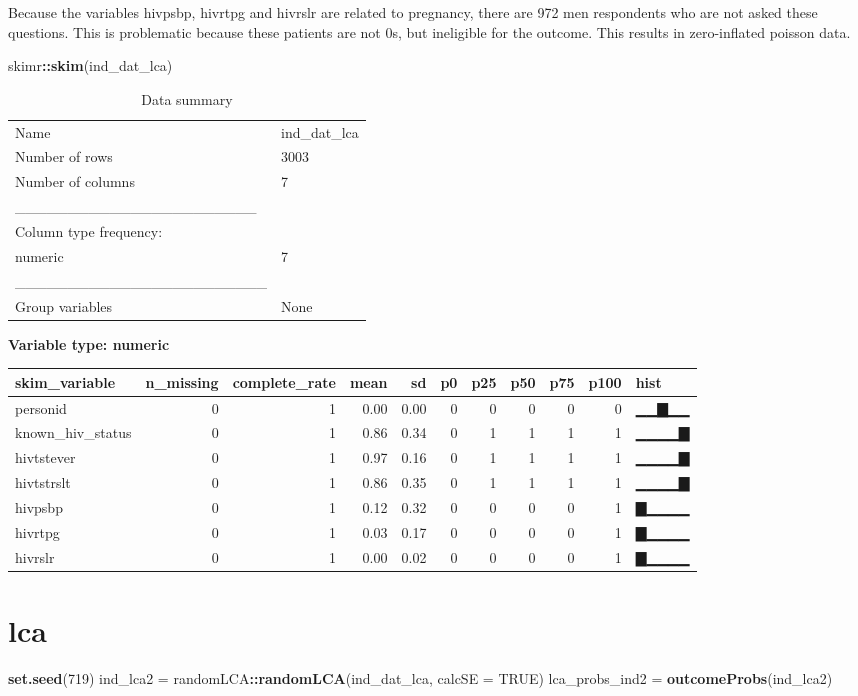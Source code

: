 \documentclass[
]{article}
\newenvironment{Shaded}{\begin{snugshade}}{\end{snugshade}}
\newcommand{\DataTypeTok}[1]{\textcolor[rgb]{0.13,0.29,0.53}{#1}}
\newcommand{\DecValTok}[1]{\textcolor[rgb]{0.00,0.00,0.81}{#1}}
\newcommand{\KeywordTok}[1]{\textcolor[rgb]{0.13,0.29,0.53}{\textbf{#1}}}
\newcommand{\NormalTok}[1]{#1}
\newcommand{\OperatorTok}[1]{\textcolor[rgb]{0.81,0.36,0.00}{\textbf{#1}}}
\newcommand{\OtherTok}[1]{\textcolor[rgb]{0.56,0.35,0.01}{#1}}
\newcommand{\StringTok}[1]{\textcolor[rgb]{0.31,0.60,0.02}{#1}}
\begin{document}
Because the variables hivpsbp, hivrtpg and hivrslr are related to
pregnancy, there are 972 men respondents who are not asked these
questions. This is problematic because these patients are not 0s, but
ineligible for the outcome. This results in zero-inflated poisson data.

\begin{Shaded}
\begin{Highlighting}[]
\NormalTok{skimr}\OperatorTok{::}\KeywordTok{skim}\NormalTok{(ind_dat_lca)}
\end{Highlighting}
\end{Shaded}

\begin{longtable}[]{@{}ll@{}}
\caption{Data summary}\tabularnewline
\toprule
\endhead
Name & ind\_dat\_lca\tabularnewline
Number of rows & 3003\tabularnewline
Number of columns & 7\tabularnewline
\_\_\_\_\_\_\_\_\_\_\_\_\_\_\_\_\_\_\_\_\_\_\_ &\tabularnewline
Column type frequency: &\tabularnewline
numeric & 7\tabularnewline
\_\_\_\_\_\_\_\_\_\_\_\_\_\_\_\_\_\_\_\_\_\_\_\_ &\tabularnewline
Group variables & None\tabularnewline
\bottomrule
\end{longtable}

\textbf{Variable type: numeric}

\begin{longtable}[]{@{}lrrrrrrrrrl@{}}
\toprule
skim\_variable & n\_missing & complete\_rate & mean & sd & p0 & p25 &
p50 & p75 & p100 & hist\tabularnewline
\midrule
\endhead
personid & 0 & 1 & 0.00 & 0.00 & 0 & 0 & 0 & 0 & 0 &
▁▁▇▁▁\tabularnewline
known\_hiv\_status & 0 & 1 & 0.86 & 0.34 & 0 & 1 & 1 & 1 & 1 &
▁▁▁▁▇\tabularnewline
hivtstever & 0 & 1 & 0.97 & 0.16 & 0 & 1 & 1 & 1 & 1 &
▁▁▁▁▇\tabularnewline
hivtstrslt & 0 & 1 & 0.86 & 0.35 & 0 & 1 & 1 & 1 & 1 &
▁▁▁▁▇\tabularnewline
hivpsbp & 0 & 1 & 0.12 & 0.32 & 0 & 0 & 0 & 0 & 1 & ▇▁▁▁▁\tabularnewline
hivrtpg & 0 & 1 & 0.03 & 0.17 & 0 & 0 & 0 & 0 & 1 & ▇▁▁▁▁\tabularnewline
hivrslr & 0 & 1 & 0.00 & 0.02 & 0 & 0 & 0 & 0 & 1 & ▇▁▁▁▁\tabularnewline
\bottomrule
\end{longtable}

\hypertarget{lca}{%
\section{lca}\label{lca}}

\begin{Shaded}
\begin{Highlighting}[]
\KeywordTok{set.seed}\NormalTok{(}\DecValTok{719}\NormalTok{)}
\NormalTok{ind_lca2 =}\StringTok{ }\NormalTok{randomLCA}\OperatorTok{::}\KeywordTok{randomLCA}\NormalTok{(ind_dat_lca, }\DataTypeTok{calcSE =} \OtherTok{TRUE}\NormalTok{)}
\NormalTok{lca_probs_ind2 =}\StringTok{ }\KeywordTok{outcomeProbs}\NormalTok{(ind_lca2)}
\end{Highlighting}
\end{Shaded}
\end{document}
